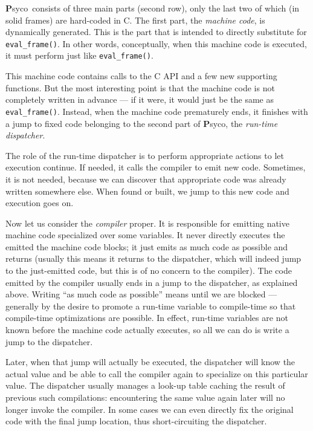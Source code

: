 \documentclass{article}
\def\Psyco{{\bf P}syco}
\def\code#1{\texttt{#1}}
\begin{document}
\Psyco\ consists of three main parts (second row), only the last two of which (in solid frames) are hard-coded in C. The first part, the \emph{machine code}, is dynamically generated. This is the part that is intended to directly substitute for \code{eval\_frame()}. In other words, conceptually, when this machine code is executed, it must perform just like \code{eval\_frame()}.

This machine code contains calls to the C API and a few new supporting functions. But the most interesting point is that the machine code is not completely written in advance --- if it were, it would just be the same as \code{eval\_frame()}. Instead, when the machine code prematurely ends, it finishes with a jump to fixed code belonging to the second part of \Psyco, the \emph{run-time dispatcher}.

The role of the run-time dispatcher is to perform appropriate actions to let execution continue. If needed, it calls the compiler to emit new code. Sometimes, it is not needed, because we can discover that appropriate code was already written somewhere else. When found or built, we jump to this new code and execution goes on.

Now let us consider the \emph{compiler} proper. It is responsible for emitting native machine code specialized over some variables. It never directly executes the emitted the machine code blocks; it just emits as much code as possible and returns (usually this means it returns to the dispatcher, which will indeed jump to the just-emitted code, but this is of no concern to the compiler). The code emitted by the compiler usually ends in a jump to the dispatcher, as explained above. Writing ``as much code as possible'' means until we are blocked --- generally by the desire to promote a run-time variable to compile-time so that compile-time optimizations are possible. In effect, run-time variables are not known before the machine code actually executes, so all we can do is write a jump to the dispatcher.

Later, when that jump will actually be executed, the dispatcher will know the actual value and be able to call the compiler again to specialize on this particular value. The dispatcher usually manages a look-up table caching the result of previous such compilations: encountering the same value again later will no longer invoke the compiler. In some cases we can even directly fix the original code with the final jump location, thus short-circuiting the dispatcher.
\end{document}
